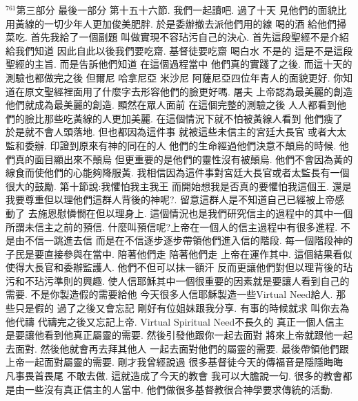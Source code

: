 \documentclass{book}
\begin{document}
$^{761}$第三部分 最後一部分 第十五十六節.
我們一起讀吧.
過了十天 見他們的面貌比用黃線的一切少年人更加俊美肥胖.
於是委辦撤去派他們用的線 喝的酒 給他們掃菜吃.
首先我給了一個副題 叫做實現不容玷污自己的決心.
首先這段聖經不是介紹給我們知道 因此自此以後我們要吃齋.
基督徒要吃齋 喝白水 不是的 這是不是這段聖經的主旨.
而是告訴他們知道 在這個過程當中 他們真的實踐了之後.
而這十天的測驗也都做完之後 但爾尼 哈拿尼亞 米沙尼 阿薩尼亞四位年青人的面貌更好.
你知道在原文聖經裡面用了什麼字去形容他們的臉更好嗎.
屠夫 上帝認為最美麗的創造 他們就成為最美麗的創造.
顯然在眾人面前 在這個完整的測驗之後 人人都看到他們的臉比那些吃黃線的人更加美麗.
在這個情況下就不怕被黃線人看到 他們瘦了 於是就不會人頭落地.
但也都因為這件事 就被這些未信主的宮廷大長官 或者大太監和委辦.
印證到原來有神的同在的人 他們的生命經過他們決意不顛烏的時候.
他們真的面目顯出來不顛烏 但更重要的是他們的靈性沒有被顛烏.
他們不會因為黃的線食而使他們的心能夠降服黃.
我相信因為這件事對宮廷大長官或者太監長有一個很大的鼓勵.
第十節說:我懼怕我主我王 而開始想我是否真的要懼怕我這個王.
還是我要尊重但以理他們這群人背後的神呢?.
留意這群人是不知道自己已經被上帝感動了 去施恩慰憐憫在但以理身上.
這個情況也是我們研究信主的過程中的其中一個所謂未信主之前的預信.
什麼叫預信呢?上帝在一個人的信主過程中有很多進程.
不是由不信一跳進去信 而是在不信逐步逐步帶領他們進入信的階段.
每一個階段神的子民是要直接參與在當中.
陪著他們走 陪著他們走 上帝在運作其中.
這個結果看似使得大長官和委辦監護人.
他們不但可以抹一額汗 反而更讓他們對但以理背後的玷污和不玷污準則的興趣.
使人信耶穌其中一個很重要的因素就是要讓人看到自己的需要.
不是你製造假的需要給他 今天很多人信耶穌製造一些Virtual Need給人.
那些只是假的 過了之後又會忘記 剛好有位姐妹跟我分享.
有事的時候就求 叫你去為他代禱 代禱完之後又忘記上帝.
Virtual Spiritual Need不長久的 真正一個人信主是要讓他看到他真正屬靈的需要.
然後引發他跟你一起去面對 將來上帝就跟他一起去面對.
然後他就會再去拜其他人 一起去面對他們的屬靈的需要.
最後帶領他們跟上帝一起面對屬靈的需要.
剛才我曾經說過 很多基督徒今天的傳福音是隱隱晦晦 凡事畏首畏尾 不敢去做.
這就造成了今天的教會 我可以大膽說一句.
很多的教會都是由一些沒有真正信主的人當中.
他們做很多基督教很合神學要求傳統的活動.
\end{document}
